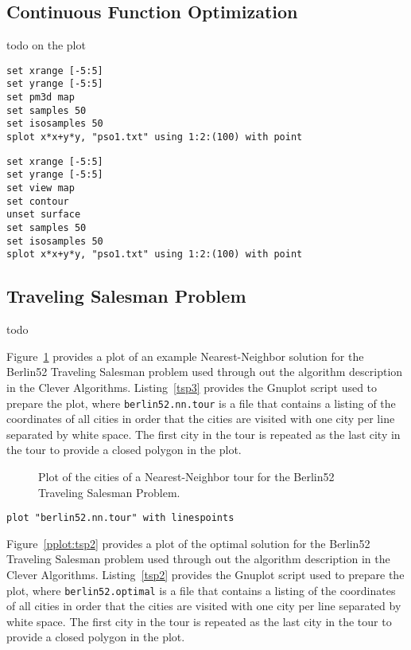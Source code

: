 \documentclass[a4paper, 11pt]{article}
\begin{document}
\subsection{Continuous Function Optimization}
todo
on the plot




\begin{lstlisting}[caption=asdasd., label=tspa3]
set xrange [-5:5]
set yrange [-5:5]
set pm3d map
set samples 50
set isosamples 50
splot x*x+y*y, "pso1.txt" using 1:2:(100) with point
\end{lstlisting}

\begin{lstlisting}[caption=asdasd., label=tspa3]
set xrange [-5:5]
set yrange [-5:5]
set view map
set contour
unset surface
set samples 50
set isosamples 50
splot x*x+y*y, "pso1.txt" using 1:2:(100) with point
\end{lstlisting}


\subsection{Traveling Salesman Problem}
todo

Figure~\ref{plot:tsp3} provides a plot of an example Nearest-Neighbor solution for the Berlin52 Traveling Salesman problem used through out the algorithm description in the Clever Algorithms. Listing~\ref{tsp3} provides the Gnuplot script used to prepare the plot, where \texttt{berlin52.nn.tour} is a file that contains a listing of the coordinates of all cities in order that the cities are visited with one city per line separated by white space. The first city in the tour is repeated as the last city in the tour to provide a closed polygon in the plot.

\begin{figure}[htp]

\caption{Plot of the cities of a Nearest-Neighbor tour for the Berlin52 Traveling Salesman Problem.}
\label{plot:tsp3}
\end{figure}

\begin{lstlisting}[caption=Gnuplot script for plotting a tour for a Traveling Salesman Problem., label=tsp3]
plot "berlin52.nn.tour" with linespoints
\end{lstlisting}


Figure~\ref{pplot:tsp2} provides a plot of the optimal solution for the Berlin52 Traveling Salesman problem used through out the algorithm description in the Clever Algorithms. Listing~\ref{tsp2} provides the Gnuplot script used to prepare the plot, where \texttt{berlin52.optimal} is a file that contains a listing of the coordinates of all cities in order that the cities are visited with one city per line separated by white space. The first city in the tour is repeated as the last city in the tour to provide a closed polygon in the plot.
\end{document}
